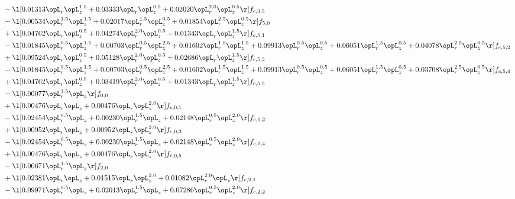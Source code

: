 \begin{alignat}{2}
& - \l[  0.01313 \opL_r \opL_z^{1.5} +  0.03333 \opL_r \opL_z^{0.5} +  0.02020 \opL_r^{2.0} \opL_z^{0.5}  \r] f_{c,3,5} \nonumber \\ 
& - \l[  0.00534 \opL_r^{1.5} \opL_z^{1.5} +  0.02017 \opL_r^{1.5} \opL_z^{0.5} +  0.01854 \opL_r^{2.5} \opL_z^{0.5}  \r] f_{5,0} \nonumber \\ 
& + \l[  0.04762 \opL_r \opL_z^{0.5} +  0.04274 \opL_r^{2.0} \opL_z^{0.5} +  0.01343 \opL_r \opL_z^{1.5}  \r] f_{c,5,1} \nonumber \\ 
& - \l[  0.01845 \opL_r^{0.5} \opL_z^{1.5} +  0.00703 \opL_r^{0.5} \opL_z^{2.5} +  0.01602 \opL_r^{1.5} \opL_z^{1.5} +  0.09913 \opL_r^{0.5} \opL_z^{0.5} +  0.06051 \opL_r^{1.5} \opL_z^{0.5} +  0.04078 \opL_r^{2.5} \opL_z^{0.5}  \r] f_{c,5,2} \nonumber \\ 
& + \l[  0.09524 \opL_r \opL_z^{0.5} +  0.05128 \opL_r^{2.0} \opL_z^{0.5} +  0.02686 \opL_r \opL_z^{1.5}  \r] f_{c,5,3} \nonumber \\ 
& - \l[  0.01845 \opL_r^{0.5} \opL_z^{1.5} +  0.00703 \opL_r^{0.5} \opL_z^{2.5} +  0.01602 \opL_r^{1.5} \opL_z^{1.5} +  0.09913 \opL_r^{0.5} \opL_z^{0.5} +  0.06051 \opL_r^{1.5} \opL_z^{0.5} +  0.03708 \opL_r^{2.5} \opL_z^{0.5}  \r] f_{c,5,4} \nonumber \\ 
& + \l[  0.04762 \opL_r \opL_z^{0.5} +  0.03419 \opL_r^{2.0} \opL_z^{0.5} +  0.01343 \opL_r \opL_z^{1.5}  \r] f_{c,5,5} \nonumber \\ 
& - \l[  0.00077 \opL_r^{1.5} \opL_z  \r] f_{0,0} \nonumber \\ 
& + \l[  0.00476 \opL_r \opL_z +  0.00476 \opL_r \opL_z^{2.0}  \r] f_{c,0,1} \nonumber \\ 
& - \l[  0.02454 \opL_r^{0.5} \opL_z +  0.00230 \opL_r^{1.5} \opL_z +  0.02148 \opL_r^{0.5} \opL_z^{2.0}  \r] f_{c,0,2} \nonumber \\ 
& + \l[  0.00952 \opL_r \opL_z +  0.00952 \opL_r \opL_z^{2.0}  \r] f_{c,0,3} \nonumber \\ 
& - \l[  0.02454 \opL_r^{0.5} \opL_z +  0.00230 \opL_r^{1.5} \opL_z +  0.02148 \opL_r^{0.5} \opL_z^{2.0}  \r] f_{c,0,4} \nonumber \\ 
& + \l[  0.00476 \opL_r \opL_z +  0.00476 \opL_r \opL_z^{2.0}  \r] f_{c,0,5} \nonumber \\ 
& - \l[  0.00671 \opL_r^{1.5} \opL_z  \r] f_{2,0} \nonumber \\ 
& + \l[  0.02381 \opL_r \opL_z +  0.01515 \opL_r \opL_z^{2.0} +  0.01082 \opL_r^{2.0} \opL_z  \r] f_{c,2,1} \nonumber \\ 
& - \l[  0.09971 \opL_r^{0.5} \opL_z +  0.02013 \opL_r^{1.5} \opL_z +  0.07286 \opL_r^{0.5} \opL_z^{2.0}  \r] f_{c,2,2} \nonumber \\ 

\end{alignat}
